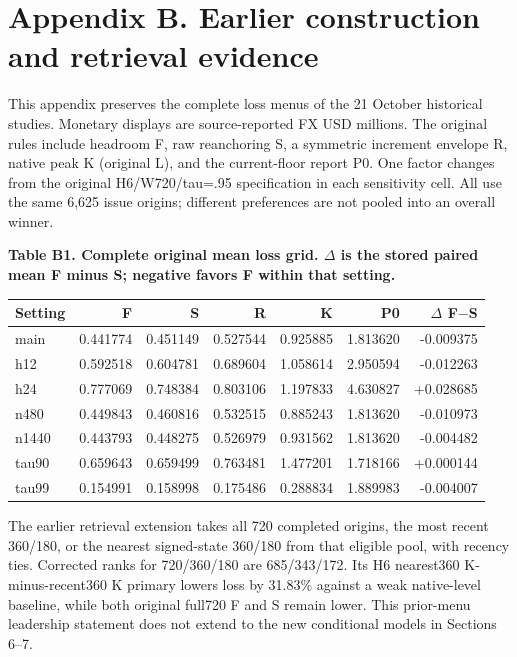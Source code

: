 \documentclass[10pt,a4paper]{article}
\begin{document}
\section*{Appendix B. Earlier construction and retrieval evidence}
This appendix preserves the complete loss menus of the 21 October historical studies. Monetary displays are source-reported FX USD millions. The original rules include headroom F, raw reanchoring S, a symmetric increment envelope R, native peak K (original L), and the current-floor report P0. One factor changes from the original H6/W720/tau=.95 specification in each sensitivity cell. All use the same 6,625 issue origins; different preferences are not pooled into an overall winner.

\begin{center}
\begin{minipage}{\linewidth}
\small\textbf{Table B1. Complete original mean loss grid. \(\Delta\) is the stored paired mean F minus S; negative favors F within that setting.}\par\medskip
\centering\fontsize{8}{10}\selectfont
\begin{tabular}{lrrrrrr}
\toprule
Setting & F & S & R & K & P0 & \(\Delta\) F\(-\)S \\
\midrule
main & 0.441774 & 0.451149 & 0.527544 & 0.925885 & 1.813620 & -0.009375 \\
h12 & 0.592518 & 0.604781 & 0.689604 & 1.058614 & 2.950594 & -0.012263 \\
h24 & 0.777069 & 0.748384 & 0.803106 & 1.197833 & 4.630827 & +0.028685 \\
n480 & 0.449843 & 0.460816 & 0.532515 & 0.885243 & 1.813620 & -0.010973 \\
n1440 & 0.443793 & 0.448275 & 0.526979 & 0.931562 & 1.813620 & -0.004482 \\
tau90 & 0.659643 & 0.659499 & 0.763481 & 1.477201 & 1.718166 & +0.000144 \\
tau99 & 0.154991 & 0.158998 & 0.175486 & 0.288834 & 1.889983 & -0.004007 \\
\bottomrule
\end{tabular}
\end{minipage}
\end{center}
The earlier retrieval extension takes all 720 completed origins, the most recent 360/180, or the nearest signed-state 360/180 from that eligible pool, with recency ties. Corrected ranks for 720/360/180 are 685/343/172. Its H6 nearest360 K-minus-recent360 K primary lowers loss by 31.83\% against a weak native-level baseline, while both original full720 F and S remain lower. This prior-menu leadership statement does not extend to the new conditional models in Sections 6–7.
\end{document}
